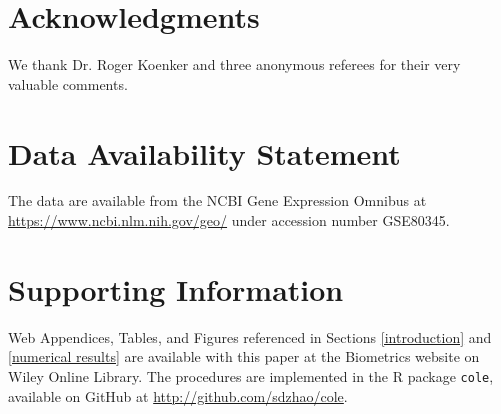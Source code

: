 \documentclass[useAMS,referee,usenatbib]{biom}
\begin{document}
\section*{Acknowledgments}
We thank Dr. Roger Koenker and three anonymous referees for their very valuable comments.\vspace*{-8pt}

\section*{Data Availability Statement}
The data are available from the NCBI Gene Expression Omnibus at \url{https://www.ncbi.nlm.nih.gov/geo/} under accession number GSE80345.

 


\section*{Supporting Information}
Web Appendices, Tables, and Figures referenced in Sections \ref{introduction} and \ref{numerical results} are available with this paper at the Biometrics website on Wiley Online Library. The procedures are implemented in the R package \verb|cole|, available on GitHub at \url{http://github.com/sdzhao/cole}.

\label{lastpage}
\end{document}
